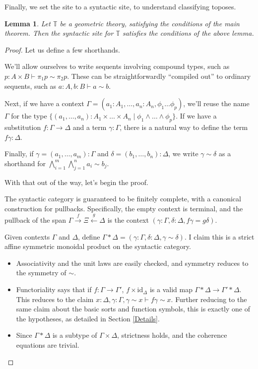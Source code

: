 \documentclass{article}
\newtheorem{lemma}[theorem]{Lemma}
\newcommand*{\T}{\mathbb{T}}
\begin{document}
Finally, we set the site to a syntactic site, to understand classifying toposes.

\begin{lemma}
    Let \(\T\) be a geometric theory, satisfying the conditions of the main theorem.
    Then the syntactic site for \(\T\) satisfies the conditions of the above lemma.
\end{lemma}

\begin{proof}
    Let us define a few shorthands.

    We'll allow ourselves to write sequents involving compound types, such as \(p : A \times B \vdash \pi_1 p \sim \pi_2 p\).
    These can be straightforwardly ``compiled out'' to ordinary sequents, such as \(a : A, b : B \vdash a \sim b\).

    Next, if we have a context \(\Gamma = (a_1 : A_1, \dots, a_n : A_n, \phi_1 \dots \phi_p)\),
    we'll reuse the name \(\Gamma\) for the type \(\{(a_1, \dots, a_n) : A_1 \times \dots \times A_n \mid \phi_1 \land \dots \land \phi_p\}\).
    If we have a substitution \(f : \Gamma \to \Delta\) and a term \(\gamma : \Gamma\),
    there is a natural way to define the term \(f\gamma : \Delta\).

    Finally, if \(\gamma = (a_1, \dots, a_m) : \Gamma\) and \(\delta = (b_1, \dots, b_n) : \Delta\),
    we write \(\gamma \sim \delta\) as a shorthand for \(\bigwedge_{i=1}^m \bigwedge_{j=1}^n a_i \sim b_j\).

    With that out of the way, let's begin the proof.

    \vspace{1em}

    \noindent The syntactic category is guaranteed to be finitely complete, with a canonical construction for pullbacks.
    Specifically, the empty context is terminal,
    and the pullback of the span \(\Gamma \xrightarrow{f} \Xi \xleftarrow{g} \Delta\) is the context \((\gamma : \Gamma, \delta : \Delta, f\gamma = g\delta)\).

    Given contexts \(\Gamma\) and \(\Delta\), define \(\Gamma * \Delta = (\gamma : \Gamma, \delta : \Delta, \gamma \sim \delta)\).
    I claim this is a strict affine symmetric monoidal product on the syntactic category.
    \begin{itemize}
        \item Associativity and the unit laws are easily checked, and symmetry reduces to the symmetry of \(\sim\).
        \item Functoriality says that if \(f : \Gamma \to \Gamma'\), \(f \times \mathrm{id}_\Delta\) is a valid map \(\Gamma * \Delta \to \Gamma' * \Delta\).
        This reduces to the claim \(x : \Delta, \gamma : \Gamma, \gamma \sim x \vdash f\gamma \sim x\).
        Further reducing to the same claim about the basic sorts and function symbols, this is exactly one of the hypotheses, as detailed in Section \ref{Details}.
        \item Since \(\Gamma * \Delta\) is a subtype of \(\Gamma \times \Delta\), strictness holds, and the coherence equations are trivial.
    \end{itemize}


\end{proof}
\end{document}

